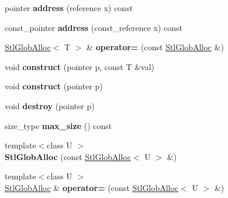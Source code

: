 \begin{DoxyCompactItemize}
\item 
\hypertarget{classStlGlobAlloc_a24fe6c264986f675065c6f920844991b}{pointer {\bfseries address} (reference x) const }\label{classStlGlobAlloc_a24fe6c264986f675065c6f920844991b}

\item 
\hypertarget{classStlGlobAlloc_ac45b7063a2a32d0777b521efef32a1fd}{const\-\_\-pointer {\bfseries address} (const\-\_\-reference x) const }\label{classStlGlobAlloc_ac45b7063a2a32d0777b521efef32a1fd}

\item 
\hypertarget{classStlGlobAlloc_ad6f8c6985353b94be492daccbb18b695}{\hyperlink{classStlGlobAlloc}{Stl\-Glob\-Alloc}$<$ T $>$ \& {\bfseries operator=} (const \hyperlink{classStlGlobAlloc}{Stl\-Glob\-Alloc} \&)}\label{classStlGlobAlloc_ad6f8c6985353b94be492daccbb18b695}

\item 
\hypertarget{classStlGlobAlloc_a21f08aa2dbf8a8957f1a63869eb99418}{void {\bfseries construct} (pointer p, const T \&val)}\label{classStlGlobAlloc_a21f08aa2dbf8a8957f1a63869eb99418}

\item 
\hypertarget{classStlGlobAlloc_a1f630fc4a1d9e126975f2776afb15be3}{void {\bfseries construct} (pointer p)}\label{classStlGlobAlloc_a1f630fc4a1d9e126975f2776afb15be3}

\item 
\hypertarget{classStlGlobAlloc_ab88f9fef4d47e0ea1bd1492deb209dcd}{void {\bfseries destroy} (pointer p)}\label{classStlGlobAlloc_ab88f9fef4d47e0ea1bd1492deb209dcd}

\item 
\hypertarget{classStlGlobAlloc_a2e80596606adaaf13901ef834a7f7664}{size\-\_\-type {\bfseries max\-\_\-size} () const }\label{classStlGlobAlloc_a2e80596606adaaf13901ef834a7f7664}

\item 
\hypertarget{classStlGlobAlloc_a9f71e9ec95028cd38b746184e966a6aa}{{\footnotesize template$<$class U $>$ }\\{\bfseries Stl\-Glob\-Alloc} (const \hyperlink{classStlGlobAlloc}{Stl\-Glob\-Alloc}$<$ U $>$ \&)}\label{classStlGlobAlloc_a9f71e9ec95028cd38b746184e966a6aa}

\item 
\hypertarget{classStlGlobAlloc_a8a8289705c81832f091a7aabca6b2bfb}{{\footnotesize template$<$class U $>$ }\\\hyperlink{classStlGlobAlloc}{Stl\-Glob\-Alloc} \& {\bfseries operator=} (const \hyperlink{classStlGlobAlloc}{Stl\-Glob\-Alloc}$<$ U $>$ \&)}\label{classStlGlobAlloc_a8a8289705c81832f091a7aabca6b2bfb}


\end{DoxyCompactItemize}

